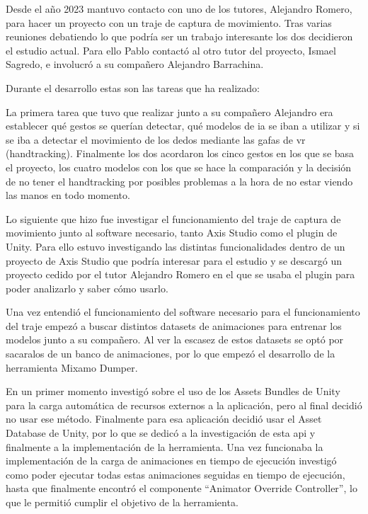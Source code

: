 Desde el año 2023 mantuvo contacto con uno de los tutores, Alejandro Romero, para hacer un proyecto con un traje de captura de movimiento.
Tras varias reuniones debatiendo lo que podría ser un trabajo interesante los dos decidieron el estudio actual.
Para ello Pablo contactó al otro tutor del proyecto, Ismael Sagredo, e involucró a su compañero Alejandro Barrachina.

Durante el desarrollo estas son las tareas que ha realizado:

La primera tarea que tuvo que realizar junto a su compañero Alejandro era establecer qué gestos se querían detectar, qué modelos de \gls{ia} se iban a utilizar y si se iba a detectar el movimiento de los dedos mediante las gafas de \gls{vr} (handtracking).
Finalmente los dos acordaron los cinco gestos en los que se basa el proyecto, los cuatro modelos con los que se hace la comparación y la decisión de no tener el handtracking por posibles problemas a la hora de no estar viendo las manos en todo momento.

Lo siguiente que hizo fue investigar el funcionamiento del traje de captura de movimiento junto al software necesario, tanto Axis Studio como el plugin de Unity.
Para ello estuvo investigando las distintas funcionalidades dentro de un proyecto de Axis Studio que podría interesar para el estudio y se descargó un proyecto cedido por el tutor Alejandro Romero en el que se usaba el plugin para poder analizarlo y saber cómo usarlo.

Una vez entendió el funcionamiento del software necesario para el funcionamiento del traje empezó a buscar distintos datasets de animaciones para entrenar los modelos junto a su compañero.
Al ver la escasez de estos datasets se optó por sacaralos de un banco de animaciones, por lo que empezó el desarrollo de la herramienta Mixamo Dumper.

En un primer momento investigó sobre el uso de los Assets Bundles de Unity para la carga automática de recursos externos a la aplicación, pero al final decidió no usar ese método.
Finalmente para esa aplicación decidió usar el Asset Database de Unity, por lo que se dedicó a la investigación de esta \gls{api} y finalmente a la implementación de la herramienta.
Una vez funcionaba la implementación de la carga de animaciones en tiempo de ejecución investigó como poder ejecutar todas estas animaciones seguidas en tiempo de ejecución, hasta que finalmente encontró el componente ``Animator Override Controller'', lo que le permitió cumplir el objetivo de la herramienta.

